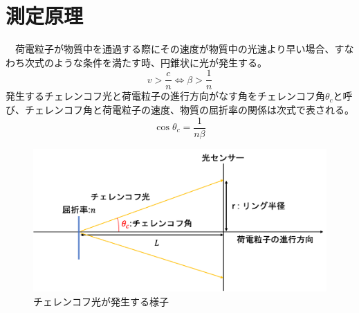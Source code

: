 \documentclass[uplatex, titlepage, dvipdfmx, 12pt, a4paper]{jsreport}
\begin{document}
\section{測定原理}
　荷電粒子が物質中を通過する際にその速度が物質中の光速より早い場合、すなわち次式のような条件を満たす時、円錐状に光が発生する。
\begin{equation}
v > \frac{c}{n} \Leftrightarrow \beta > \frac{1}{n} 
\end{equation}
発生するチェレンコフ光と荷電粒子の進行方向がなす角をチェレンコフ角$\theta_c$と呼び、チェレンコフ角と荷電粒子の速度、物質の屈折率の関係は次式で表される。
\begin{equation}
\cos \theta_c = \frac{1}{n\beta}
\end{equation}
\begin{figure}[h]
  \begin{center} 
    \includegraphics[clip, scale=0.5]{image/cherenkov.png}
    \caption{チェレンコフ光が発生する様子} 
    \label{fig:cherenkov} 
  \end{center}
\end{figure}
\end{document}
